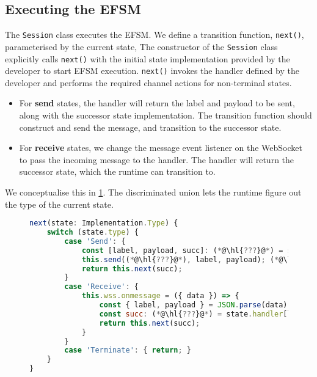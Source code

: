 \subsection{Executing the EFSM}
\label{subsection:noderuntimeprivate}

The \texttt{Session} class executes the EFSM.
We define a transition function, \texttt{next()}, 
parameterised by the current state,
The constructor of the \texttt{Session} class
explicitly calls \texttt{next()} with the 
initial state implementation provided by the developer
to start EFSM execution.
\texttt{next()} invokes the handler defined by the developer
and performs the required channel actions for non-terminal states.

\begin{itemize}
\item 
For \textbf{send} states, the handler will
return the label and payload to be sent, along with the
successor state implementation. The transition function
should construct and send the message, 
and transition to the successor state.

\item
For \textbf{receive} states, we change the
message event listener on the WebSocket to
pass the incoming message to the handler.
The handler will return the successor state,
which the runtime can transition to.

\end{itemize}

We conceptualise this in \cref{lst:noderuntimesimple}.
The discriminated union lets the runtime figure out
the type of the current state.

\begin{figure}[!h]
\begin{lstlisting}[language=javascript,tabsize=2]
next(state: Implementation.Type) {
	switch (state.type) {
		case 'Send': {
			const [label, payload, succ]: (*@\hl{???}@*) = state.handler;	 (*@\label{line:noderuntimebadtype1}@*)
			this.send((*@\hl{???}@*), label, payload); (*@\label{line:noderuntimeunknownrole}@*)		
			return this.next(succ);
		}
		case 'Receive': {
			this.wss.onmessage = ({ data }) => {
				const { label, payload } = JSON.parse(data) as (*@\hl{???}@*); (*@\label{line:noderuntimebadtype2}@*)
				const succ: (*@\hl{???}@*) = state.handler[label](...payload); (*@\label{line:noderuntimebadtype3}@*)
				return this.next(succ);
			}
		}
		case 'Terminate': { return; }
	}
}
\end{lstlisting}
\label{lst:noderuntimesimple}
\end{figure}

